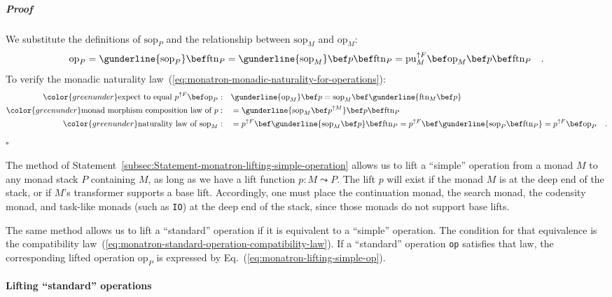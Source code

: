 \subparagraph{Proof}

We substitute the definitions of $\text{sop}_{P}$ and the relationship
between $\text{sop}_{M}$ and $\text{op}_{M}$:
\[
\text{op}_{P}=\gunderline{\text{sop}_{P}}\bef\text{ftn}_{P}=\gunderline{\text{sop}_{M}}\bef p\bef\text{ftn}_{P}=\text{pu}_{M}^{\uparrow F}\bef\text{op}_{M}\bef p\bef\text{ftn}_{P}\quad.
\]
To verify the monadic naturality law~(\ref{eq:monatron-monadic-naturality-for-operations}):
\begin{align*}
{\color{greenunder}\text{expect to equal }p^{\uparrow F}\bef\text{op}_{P}:}\quad & \gunderline{\text{op}_{M}}\bef p=\text{sop}_{M}\bef\gunderline{\text{ftn}_{M}\bef p}\\
{\color{greenunder}\text{monad morphism composition law of }p:}\quad & =\gunderline{\text{sop}_{M}\bef p^{\uparrow M}}\bef p\bef\text{ftn}_{P}\\
{\color{greenunder}\text{naturality law of }\text{sop}_{M}:}\quad & =p^{\uparrow F}\bef\gunderline{\text{sop}_{M}\bef p}\bef\text{ftn}_{P}=p^{\uparrow F}\bef\gunderline{\text{sop}_{P}\bef\text{ftn}_{P}}=p^{\uparrow F}\bef\text{op}_{P}\quad.
\end{align*}
$\square$

The method of Statement~\ref{subsec:Statement-monatron-lifting-simple-operation}
allows us to lift a \textsf{``}simple\textsf{''} operation from a monad $M$ to any
monad stack $P$ containing $M$, as long as we have a lift function
$p:M\leadsto P$. The lift $p$ will exist if the monad $M$ is at
the deep end of the stack, or if $M$\textsf{'}s transformer supports a base
lift. Accordingly, one must place the continuation monad, the search
monad, the codensity monad, and task-like monads (such as \lstinline!IO!)
at the deep end of the stack, since those monads do not support base
lifts.

The same method allows us to lift a \textsf{``}standard\textsf{''} operation if it
is equivalent to a \textsf{``}simple\textsf{''} operation. The condition for that
equivalence is the compatibility law~(\ref{eq:monatron-standard-operation-compatibility-law}).
If a \textsf{``}standard\textsf{''} operation \lstinline!op! satisfies that law,
the corresponding lifted operation $\text{op}_{P}$ is expressed by
Eq.~(\ref{eq:monatron-lifting-simple-op}).

\paragraph{Lifting \textsf{``}standard\textsf{''} operations}

